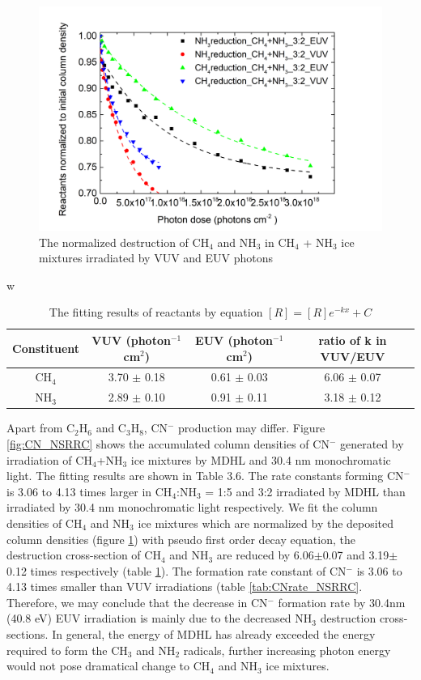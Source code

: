 \begin{figure}
\centering
\includegraphics[width=\textwidth]{figures/chapter3/Normalized_reactants.png}
\caption{The normalized destruction of CH$_4$ and NH$_3$ in CH$_4$ + NH$_3$ ice mixtures irradiated by VUV and EUV photons}
\label{fig:normalized_reactants}
\end{figure}
w
\begin{table}[htbp]
\caption{The fitting results of reactants by equation $[R]=[R]e^{-kx}+C$}
\label{tab:reactants}
\begin{tabular}{cccc}
\hline
\hline
Constituent & VUV (photon$^{-1}$cm$^2$) & EUV (photon$^{-1}$cm$^2$) & ratio of k in VUV/EUV\\
\hline
CH$_4$ & 3.70 $\pm$ 0.18 & 0.61 $\pm$ 0.03 & 6.06 $\pm$ 0.07\\
NH$_3$ & 2.89 $\pm$ 0.10 & 0.91 $\pm$ 0.11 & 3.18 $\pm$ 0.12\\
\hline
\end{tabular}
\end{table}

Apart from C$_2$H$_6$ and C$_3$H$_8$, CN$^-$ production may differ. Figure \ref{fig:CN_NSRRC} shows the accumulated column densities of CN$^-$ generated by irradiation of CH$_4$+NH$_3$ ice mixtures by MDHL and 30.4 nm monochromatic light. The fitting results are shown in Table 3.6. The rate constants forming CN$^-$ is 3.06 to 4.13 times larger in CH$_4$:NH$_3$ = 1:5 and 3:2 irradiated by MDHL than irradiated by 30.4 nm monochromatic light respectively. We fit the column densities of CH$_4$ and NH$_3$ ice mixtures which are normalized by the deposited column densities (figure \ref{fig:normalized_reactants}) with pseudo first order decay equation, the destruction cross-section of CH$_4$ and NH$_3$ are reduced by 6.06$\pm$0.07 and 3.19$\pm$0.12 times respectively (table \ref{tab:reactants}). The formation rate constant of CN$^-$ is 3.06 to 4.13 times smaller than VUV irradiations (table \ref{tab:CNrate_NSRRC}. Therefore, we may conclude that the decrease in CN$^-$ formation rate by 30.4nm (40.8 eV) EUV irradiation is mainly due to the decreased NH$_3$ destruction cross-sections. In general, the energy of MDHL has already exceeded the energy required to form the CH$_3$ and NH$_2$ radicals, further increasing photon energy would not pose dramatical change to CH$_4$ and NH$_3$ ice mixtures.\\

